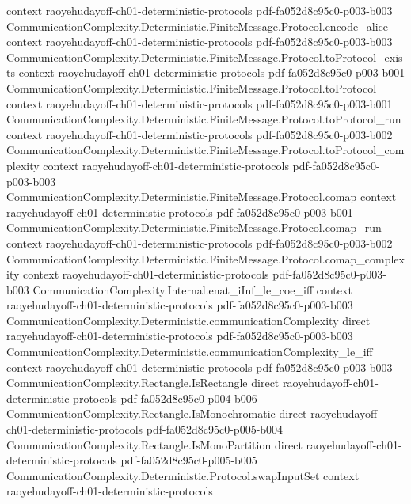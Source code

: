 \begin{theorem}
  {context}
  {raoyehudayoff-ch01-deterministic-protocols}
  {pdf-fa052d8c95c0-p003-b003}
\proofstep
  {CommunicationComplexity.Deterministic.FiniteMessage.Protocol.encode_alice}
  {context}
  {raoyehudayoff-ch01-deterministic-protocols}
  {pdf-fa052d8c95c0-p003-b003}
\proofstep
  {CommunicationComplexity.Deterministic.FiniteMessage.Protocol.toProtocol_exists}
  {context}
  {raoyehudayoff-ch01-deterministic-protocols}
  {pdf-fa052d8c95c0-p003-b001}
\proofstep
  {CommunicationComplexity.Deterministic.FiniteMessage.Protocol.toProtocol}
  {context}
  {raoyehudayoff-ch01-deterministic-protocols}
  {pdf-fa052d8c95c0-p003-b001}
\proofstep
  {CommunicationComplexity.Deterministic.FiniteMessage.Protocol.toProtocol_run}
  {context}
  {raoyehudayoff-ch01-deterministic-protocols}
  {pdf-fa052d8c95c0-p003-b002}
\proofstep
  {CommunicationComplexity.Deterministic.FiniteMessage.Protocol.toProtocol_complexity}
  {context}
  {raoyehudayoff-ch01-deterministic-protocols}
  {pdf-fa052d8c95c0-p003-b003}
\proofstep
  {CommunicationComplexity.Deterministic.FiniteMessage.Protocol.comap}
  {context}
  {raoyehudayoff-ch01-deterministic-protocols}
  {pdf-fa052d8c95c0-p003-b001}
\proofstep
  {CommunicationComplexity.Deterministic.FiniteMessage.Protocol.comap_run}
  {context}
  {raoyehudayoff-ch01-deterministic-protocols}
  {pdf-fa052d8c95c0-p003-b002}
\proofstep
  {CommunicationComplexity.Deterministic.FiniteMessage.Protocol.comap_complexity}
  {context}
  {raoyehudayoff-ch01-deterministic-protocols}
  {pdf-fa052d8c95c0-p003-b003}
\proofstep
  {CommunicationComplexity.Internal.enat_iInf_le_coe_iff}
  {context}
  {raoyehudayoff-ch01-deterministic-protocols}
  {pdf-fa052d8c95c0-p003-b003}
\proofstep
  {CommunicationComplexity.Deterministic.communicationComplexity}
  {direct}
  {raoyehudayoff-ch01-deterministic-protocols}
  {pdf-fa052d8c95c0-p003-b003}
\proofstep
  {CommunicationComplexity.Deterministic.communicationComplexity_le_iff}
  {context}
  {raoyehudayoff-ch01-deterministic-protocols}
  {pdf-fa052d8c95c0-p003-b003}
\proofstep
  {CommunicationComplexity.Rectangle.IsRectangle}
  {direct}
  {raoyehudayoff-ch01-deterministic-protocols}
  {pdf-fa052d8c95c0-p004-b006}
\proofstep
  {CommunicationComplexity.Rectangle.IsMonochromatic}
  {direct}
  {raoyehudayoff-ch01-deterministic-protocols}
  {pdf-fa052d8c95c0-p005-b004}
\proofstep
  {CommunicationComplexity.Rectangle.IsMonoPartition}
  {direct}
  {raoyehudayoff-ch01-deterministic-protocols}
  {pdf-fa052d8c95c0-p005-b005}
\proofstep
  {CommunicationComplexity.Deterministic.Protocol.swapInputSet}
  {context}
  {raoyehudayoff-ch01-deterministic-protocols}

\end{theorem}
